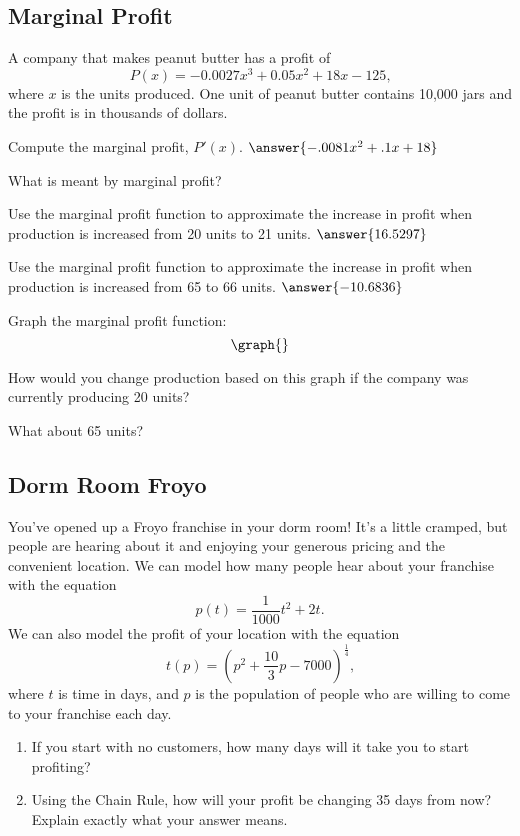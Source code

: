 \documentclass[handout]{ximera}
\begin{document}
\subsection{Marginal Profit}
A company that makes peanut butter has a profit of $$P(x)=-0.0027x^3+0.05x^2+18x-125\text{,}$$ where $x$ is the units produced. One unit of peanut butter contains 10,000 jars and the profit is in thousands of dollars.
\begin{question}
Compute the marginal profit, $P'(x)$. $\answer{-.0081x^2+.1x+18}$

What is meant by marginal profit?
\begin{freeResponse}
\end{freeResponse}
\end{question}
\begin{question}
Use the marginal profit function to approximate the increase in profit when production is increased from 20 units to 21 units.
$\answer{16.5297}$
\end{question}
\begin{question}
Use the marginal profit function to approximate the increase in profit when production is increased from 65 to 66 units. $\answer{-10.6836}$
\end{question}
\begin{question}
Graph the marginal profit function:
\[
\graph{}
\]

How would you change production based on this graph if the company was currently producing 20 units? 
\begin{multipleChoice}
\end{multipleChoice}
What about 65 units?
\begin{multipleChoice}
\end{multipleChoice}
\end{question}
\subsection{Dorm Room Froyo}
You've opened up a Froyo franchise in your dorm room! It's a little cramped, but people are hearing about it and enjoying your generous pricing and the convenient location. We can model how many people hear about your franchise with the equation $$p(t) = \frac{1}{1000}t^2 + 2t \text{.}$$ We can also model the profit of your location with the equation $$t(p) = (p^2 + \frac{10}{3}p - 7000)^{\frac{1}{4}} \text{,}$$ where $t$ is time in days, and $p$ is the population of people who are willing to come to your franchise each day.

\begin{enumerate}
\item{If you start with no customers, how many days will it take you to start profiting?}
\item{Using the Chain Rule, how will your profit be changing 35 days from now? Explain exactly what your answer means.}
\end{enumerate}
\pagebreak
\end{document}
